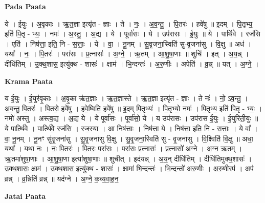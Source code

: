\documentclass[17pt]{extarticle}
\begin{document}
\textbf{Pada Paata} \newline

ये । ई॒युः । अ॒वृ॒काः । ऋ॒त॒ज्ञा इत्यृ॑त - ज्ञाः । ते । नः॒ । अ॒व॒न्तु॒ । पि॒तरः॑ । हवे॑षु ॥ इ॒दम् । पि॒तृभ्य॒ इति॑ पि॒तृ - भ्यः॒ । नमः॑ । अ॒स्तु॒ । अ॒द्य । ये । पूर्वा॑सः । ये । उप॑रासः । ई॒युः ॥ ये । पार्थि॑वे । रज॑सि । एति॑ । निष॑त्ता॒ इति॒ नि - स॒त्ताः॒ । ये । वा॒ । नू॒नम् । सु॒वृ॒जना॒स्विति॑ सु-वृ॒जना॑सु । वि॒क्षु ॥ अध॑ । यथा᳚ । नः॒ । पि॒तरः॑ । परा॑सः । प्र॒त्नासः॑ । अ॒ग्ने॒ । ऋ॒तम् । आ॒शु॒षा॒णाः ॥ शुचि॑ । इत् । अ॒य॒न्न् । दीधि॑तिम् । उ॒क्थ॒शास॒ इत्यु॑क्थ - शासः॑ । क्षाम॑ । भि॒न्दन्तः॑ । अ॒रु॒णीः । अपेति॑ । व्र॒न्न् ॥ यत् । अ॒ग्ने॒ ।  \newline


\textbf{Krama Paata} \newline

य ई॒युः । ई॒युर॑वृ॒काः । अ॒वृ॒का ऋ॑त॒ज्ञाः । ऋ॒त॒ज्ञास्ते । ऋ॒त॒ज्ञा इत्यृ॑त - ज्ञाः । ते नः॑ । नो॒ ऽव॒न्तु॒ । अ॒व॒न्तु॒ पि॒तरः॑ । पि॒तरो॒ हवे॑षु । हवे॒ष्विति॒ हवे॑षु ॥ इ॒दम् पि॒तृभ्यः॑ । पि॒तृभ्यो॒ नमः॑ । पि॒तृभ्य॒ इति॑ पि॒तृ - भ्यः॒ । नमो॑ अस्तु । अस्त्व॒द्य । अ॒द्य ये । ये पूर्वा॑सः । पूर्वा॑सो॒ ये । य उप॑रासः । उप॑रास ई॒युः । ई॒युरिती॒युः ॥ ये पार्त्थि॑वे । पार्त्थि॑वे॒ रज॑सि । रज॒स्या । आ निष॑त्ताः । निष॑त्ता॒ ये । निष॑त्ता॒ इति॒ नि - स॒त्ताः॒ । ये वा᳚ । वा॒ नू॒नम् । नू॒नꣳ सु॑वृ॒जना॑सु । सु॒वृ॒जना॑सु वि॒क्षु । सु॒वृ॒जना॒स्विति॑ सु - वृ॒जना॑सु । वि॒क्ष्विति॑ वि॒क्षु ॥ अधा॒ यथा᳚ । यथा॑ नः । नः॒ पि॒तरः॑ । पि॒तरः॒ परा॑सः । परा॑सः प्र॒त्नासः॑ । प्र॒त्नासो॑ अग्ने । अ॒ग्न॒ ऋ॒तम् । ऋ॒तमा॑शुषा॒णाः । आ॒शु॒षा॒णा इत्या॑शुषा॒णाः ॥ शुचीत् । इद॑यन्न् । अ॒य॒न् दीधि॑तिम् । दीधि॑तिमुक्थ॒शासः॑ । उ॒क्थ॒शासः॒ क्षाम॑ । उ॒क्थ॒शास॒ इत्यु॑क्थ - शासः॑ । क्षामा॑ भि॒न्दन्तः॑ । भि॒न्दन्तो॑ अरु॒णीः । अ॒रु॒णीरप॑ । अप॑ व्रन्न् । व्र॒न्निति॑ व्रन्न् ॥ यद॑ग्ने । अ॒ग्ने॒ क॒व्य॒वा॒ह॒न॒ \newline

\textbf{Jatai Paata} \newline
\end{document}

